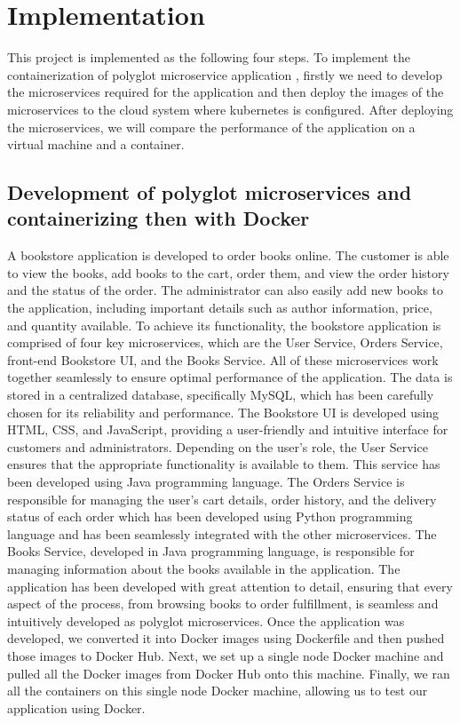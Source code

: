 \section{Implementation}
This project is implemented as the following four steps. To implement the containerization of polyglot microservice application , firstly we need to develop the microservices required for the application and then deploy the images of the microservices to the cloud system where kubernetes is configured. After deploying the microservices, we will compare the performance of the application on a virtual machine and a container. 


\subsection{Development of polyglot microservices and containerizing then with Docker}
A bookstore application is developed to order books online. The customer is able to view the books, add books to the cart, order them, and view the order history and the status of the order. The administrator can also easily add new books to the application, including important details such as author information, price, and quantity available. To achieve its functionality, the bookstore application is comprised of four key microservices, which are the User Service, Orders Service, front-end Bookstore UI, and the Books Service. All of these microservices work together seamlessly to ensure optimal performance of the application. The data is stored in a centralized database, specifically MySQL, which has been carefully chosen for its reliability and performance. The Bookstore UI is developed using HTML, CSS, and JavaScript, providing a user-friendly and intuitive interface for customers and administrators. Depending on the user's role, the User Service ensures that the appropriate functionality is available to them. This  service has been developed using Java programming language. The Orders Service is responsible for managing the user's cart details, order history, and the delivery status of each order which has been developed using Python programming language and has been seamlessly integrated with the other microservices. The Books Service, developed in Java programming language, is responsible for managing information about the books available in the application.  The application has been developed with great attention to detail, ensuring that every aspect of the process, from browsing books to order fulfillment, is seamless and intuitively developed as polyglot microservices. Once the application was developed, we converted it into Docker images using Dockerfile and then pushed those images to Docker Hub. Next, we set up a single node Docker machine and pulled all the Docker images from Docker Hub onto this machine. Finally, we ran all the containers on this single node Docker machine, allowing us to test our application using Docker.

